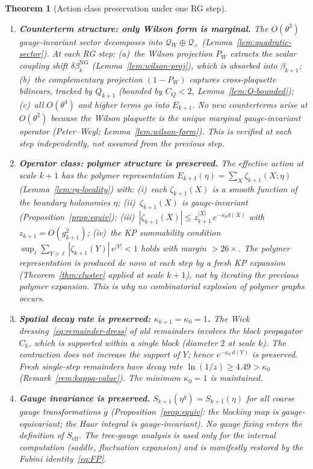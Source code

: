 \documentclass[11pt]{article}
\newtheorem{theorem}{Theorem}[section]
\theoremstyle{definition}
\begin{document}
\begin{theorem}[Action class preservation under one RG step]
\begin{enumerate}[nosep,label=(S\arabic*)]
\item \textbf{Counterterm structure: only Wilson form is marginal.}
The $O(\theta^2)$ gauge-invariant sector decomposes into
$\mathcal{Q}_W\oplus\mathcal{Q}_\times$
(Lemma~\ref{lem:quadratic-sector}).  At each RG step:
(a)~the Wilson projection $P_W$ extracts the scalar
coupling shift $\delta\beta_k^{\mathrm{NG}}$
(Lemma~\ref{lem:wilson-proj}), which is absorbed into
$\beta_{k+1}$; (b)~the complementary projection
$(1-P_W)$ captures cross-plaquette bilinears,
tracked by $Q_{k+1}$ (bounded by $C_Q<2$,
Lemma~\ref{lem:Q-bounded}); (c)~all $O(\theta^4)$
and higher terms go into $E_{k+1}$.
No new counterterms arise at $O(\theta^2)$ because
the Wilson plaquette is the unique marginal
gauge-invariant operator (Peter--Weyl;
Lemma~\ref{lem:wilson-form}).  This is verified at
\emph{each step independently}, not assumed from the
previous step.

\item \textbf{Operator class: polymer structure is preserved.}
The effective action at scale $k{+}1$ has the polymer
representation
$E_{k+1}(\eta)=\sum_{X}\zeta_{k+1}(X;\eta)$
(Lemma~\ref{lem:rg-locality}) with:
(i)~each $\zeta_{k+1}(X)$ is a smooth function of the
boundary holonomies $\eta$;
(ii)~$\zeta_{k+1}(X)$ is gauge-invariant
(Proposition~\ref{prop:equiv});
(iii)~$|\zeta_{k+1}(X)|\le z_{k+1}^{|X|}\,e^{-\kappa_0 d(X)}$
with $z_{k+1}=O(g_{k+1}^2)$;
(iv)~the KP summability condition
$\sup_\ell\sum_{Y\ni\ell}|\zeta_{k+1}(Y)|\,e^{|Y|}<1$
holds with margin $>26\times$.
The polymer representation is produced de novo at each
step by a fresh KP expansion (Theorem~\ref{thm:cluster}
applied at scale $k{+}1$), not by iterating the previous
polymer expansion.  This is why no combinatorial explosion
of polymer graphs occurs.

\item \textbf{Spatial decay rate is preserved: $\kappa_{k+1}=\kappa_0=1$.}
The Wick dressing~\eqref{eq:remainder-dress} of old
remainders involves the block propagator $C_k$, which is
\emph{supported within a single block} (diameter $2$ at
scale $k$).  The contraction does not increase the
support of $Y$; hence $e^{-\kappa_0\,d(Y)}$ is preserved.
Fresh single-step remainders have decay rate
$\ln(1/z)\ge 4.49>\kappa_0$ (Remark~\ref{rem:kappa-value}).
The minimum $\kappa_0=1$ is maintained.

\item \textbf{Gauge invariance is preserved.}
$S_{k+1}(\eta^{\bar g})=S_{k+1}(\eta)$ for all coarse gauge
transformations $\bar g$ (Proposition~\ref{prop:equiv}:
the blocking map is gauge-equivariant; the Haar integral is
gauge-invariant).  No gauge fixing enters the definition of
$S_{\mathrm{eff}}$.  The tree-gauge analysis is used only
for the \emph{internal computation} (saddle, fluctuation
expansion) and is manifestly restored by the Fubini
identity~\eqref{eq:FP}.
\end{enumerate}
\end{theorem}
\end{document}
